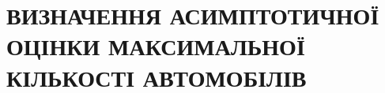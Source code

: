 \chapter{ВИЗНАЧЕННЯ АСИМПТОТИЧНОЇ ОЦІНКИ МАКСИМАЛЬНОЇ КІЛЬКОСТІ АВТОМОБІЛІВ} 
\label{chapter:asymptotics}

